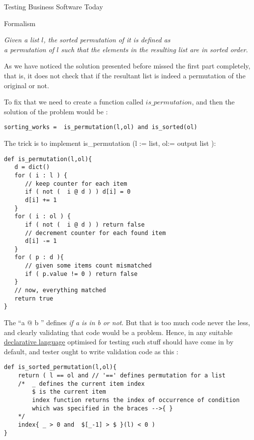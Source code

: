 \begin{section}{Testing Business Software Today}
\begin{subsection}{Formalism}
\begin{center}
\emph{ Given a list $l$, the sorted permutation of it is defined as \\ a permutation of $l$ such that the elements in the resulting list are in sorted order.}
\end{center}

As we have noticed the solution presented before missed the first part completely, that is, it does not check that if the resultant list is indeed a permutation of the original or not.

To fix that we need to create a function called $is\_permutation$, and then the solution of the problem would be :

\begin{lstlisting}[style=JexlStyle]
sorting_works =  is_permutation(l,ol) and is_sorted(ol) 
\end{lstlisting}

The trick is to implement is\_permutation (l := list, ol:= output list ):

\begin{lstlisting}[style=JexlStyle]
def is_permutation(l,ol){
   d = dict()
   for ( i : l ) {
      // keep counter for each item 
      if ( not (  i @ d ) ) d[i] = 0 
      d[i] += 1  
   }
   for ( i : ol ) {
      if ( not (  i @ d ) ) return false 
      // decrement counter for each found item 
      d[i] -= 1  
   }
   for ( p : d ){
      // given some items count mismatched 
      if ( p.value != 0 ) return false 
   }
   // now, everything matched 
   return true 
}
\end{lstlisting}

The ``a @ b ''  defines \emph{ if a is in b or not}. But that is too much code never the less, and clearly validating that code would be a problem. Hence, in any suitable \href{https://en.wikipedia.org/wiki/Declarative_programming}{declarative language} optimised for testing such stuff should have come in by default, and tester ought to write validation code as this :

\begin{lstlisting}[style=JexlStyle]
def is_sorted_permutation(l,ol){
    return ( l == ol and // '==' defines permutation for a list 
    /*  _ defines the current item index 
        $ is the current item 
        index function returns the index of occurrence of condition 
        which was specified in the braces -->{ }
    */
    index{ _ > 0 and  $[_-1] > $ }(l) < 0 )
}
\end{lstlisting}


\end{subsection}
\end{section}
